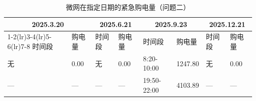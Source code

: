 \begin{table}[H]
\centering
{}
\begin{tabular}{llllllll}
\toprule
\multicolumn{2}{c}{2025.3.20} & \multicolumn{2}{c}{2025.6.21} & \multicolumn{2}{c}{2025.9.23} & \multicolumn{2}{c}{2025.12.21} \\
\cmidrule(lr){1-2}\cmidrule(lr){3-4}\cmidrule(lr){5-6}\cmidrule(lr){7-8}
时间段 & 购电量 & 时间段 & 购电量 & 时间段 & 购电量 & 时间段 & 购电量 \\
\midrule
无 & 0.00 & 无 & 0.00 & 8:20-10:00 & 1247.80 & 无 & 0.00 \\
— & — & — & — & 19:50-22:00 & 4103.89 & — & — \\
\bottomrule
\end{tabular}
\caption{微网在指定日期的紧急购电量（问题二）}
\label{tab:m3-q2}
\end{table}
\par{}
